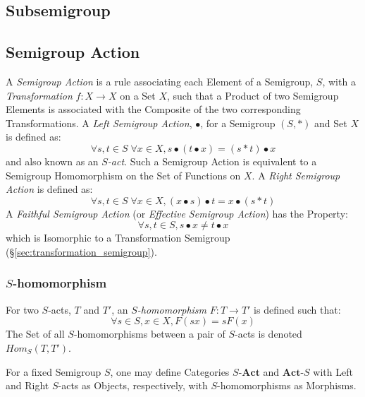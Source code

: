 \subsection{Subsemigroup}\label{sec:subsemigroup}

\subsection{Semigroup Action}\label{sec:semigroup_action}

A \emph{Semigroup Action} is a rule associating each Element of a
Semigroup, $S$, with a \emph{Transformation} $f : X \rightarrow X$ on
a Set $X$, such that a Product of two Semigroup Elements is associated
with the Composite of the two corresponding Transformations. A
\emph{Left Semigroup Action}, $\bullet$, for a Semigroup $(S,*)$ and
Set $X$ is defined as:
\[
  \forall s,t \in S\;\forall x \in X, s \bullet (t \bullet x) = (s * t)
  \bullet x
\]
and also known as an \emph{$S$-act}. Such a Semigroup Action is
equivalent to a Semigroup Homomorphism on the Set of Functions on $X$.
A \emph{Right Semigroup Action} is defined as:
\[
  \forall s,t \in S\;\forall x \in X, (x \bullet s) \bullet t = x
  \bullet (s * t)
\]
A \emph{Faithful Semigroup Action} (or \emph{Effective Semigroup
  Action}) has the Property:
\[
  \forall s, t \in S, s \bullet x \neq t \bullet x
\]
which is Isomorphic to a Transformation Semigroup
(\S\ref{sec:transformation_semigroup}).



\subsubsection{$S$-homomorphism}\label{sec:s_homomorphism}

For two $S$-acts, $T$ and $T'$, an \emph{$S$-homomorphism} $F : T
\rightarrow T'$ is defined such that:
\[
  \forall s \in S, x \in X, F(sx) = sF(x)
\]
The Set of all $S$-homomorphisms between a pair of $S$-acts is denoted
$Hom_S(T,T')$.

For a fixed Semigroup $S$, one may define Categories
$S\text{-}\mathbf{Act}$ and $\mathbf{Act}\text{-}S$ with Left and
Right $S$-acts as Objects, respectively, with $S$-homomorphisms as
Morphisms.



